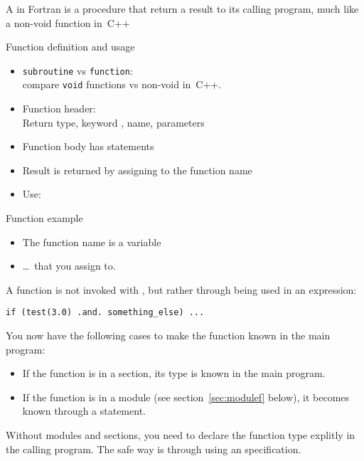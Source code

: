 A  in Fortran is a procedure that return a
result to its calling program, much like a non-void function in~C++

\begin{block}{Function definition and usage}
  \label{sl:ffunction-def}
  \begin{itemize}
  \item \lstinline$subroutine$ vs \lstinline$function$:\\
    compare \lstinline$void$ functions vs non-void in~C++.
  \item Function header:\\
    Return type, keyword , name, parameters
  \item Function body has statements
  \item Result is returned by assigning to the function name
  \item Use: 
  \end{itemize}
\end{block}

\begin{block}{Function example}
  \label{sl:ffunction-ex}
  \begin{itemize}
  \item The function name is a variable
  \item \ldots~that you assign to.
  \end{itemize}
\end{block}

A function is not invoked with , but rather through being used
in an expression:
\begin{lstlisting}
if (test(3.0) .and. something_else) ...
\end{lstlisting}
You now have the following cases to make the function known in the
main program:
\begin{itemize}
\item If the function is in a  section, its type is known
  in the main program.
\item If the function is in a module (see section~\ref{sec:modulef}
  below), it becomes known through a  statement.
\end{itemize}

\begin{f77note}
  Without modules and  sections, you need to declare the
  function type explitly in the calling program. The safe way is
  through using an  specification.
\end{f77note}

